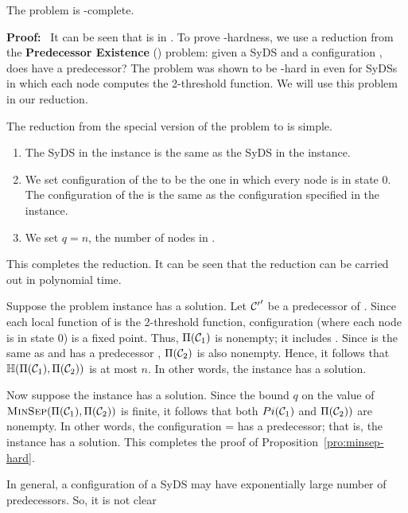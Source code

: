 \begin{proposition}\label{pro:minsep-hard}
The \mps{} problem is \cnp-complete.
\end{proposition}

\noindent
\textbf{Proof:}~ It can be seen that \mps{} is in \cnp.
To prove \cnp-hardness,
we use a reduction from the 
\textbf{Predecessor Existence} (\pre) problem: given a SyDS \cals{} and
a configuration \calc, does \calc{} have a predecessor?
The \pre{} problem was shown to be \cnp-hard in \cite{BH+07}
even for SyDSs in which each node computes the 2-threshold function.
We will use this problem in our reduction.

\smallskip

\noindent
The reduction from the special version of the \pre{} problem to \mps{}
is simple.
\begin{enumerate}
\item The SyDS \cals{} in the \mps{} instance is the same as the SyDS in the
\pre{} instance.
\item We set configuration \calcone{} of the \mps{} to be the one in which
every node is in state 0.
The configuration \calctwo{} of the \mps{} is the same as the configuration
\calc{} specified in the \pre{} instance.
\item We set $q = n$, the number of nodes in \cals.
\end{enumerate}
This completes the reduction. It can be seen that the reduction
can be carried out in polynomial time.

Suppose the \pre{} problem instance has a solution.
Let $\mbox{$\mathcal{C'}$}'$ be a predecessor of \calc.
Since each local function of \cals{} is the 2-threshold function,
configuration \calcone{} (where each node is in state 0) is a fixed point.
Thus, $\Pi(\mbox{$\mathcal{C}_{1}$})$ is nonempty; it includes \calcone.
Since \calctwo{} is the same as \calc{} and \calc{} has a
predecessor \calcp,  $\Pi(\mbox{$\mathcal{C}_{2}$})$ is also nonempty. 
Hence, it follows that $\mbox{$\mathbb{H}$}(\Pi(\mbox{$\mathcal{C}_{1}$}), \Pi(\mbox{$\mathcal{C}_{2}$}))$ is at most $n$.
In other words, the \mps{} instance has a solution.

Now suppose the \mps{} instance has a solution.
Since the bound $q$ on the value of 
$\mbox{\textsc{MinSep}}(\Pi(\mbox{$\mathcal{C}_{1}$}), \Pi(\mbox{$\mathcal{C}_{2}$}))$ is finite, 
it follows that both 
$Pi(\mbox{$\mathcal{C}_{1}$})$ and $\Pi(\mbox{$\mathcal{C}_{2}$}))$ are nonempty. 
In other words, the configuration \calctwo{} = \calc{}
has a predecessor; that is, the \pre{} instance has a solution.
This completes the proof of Proposition~\ref{pro:minsep-hard}. \QED

In general, a configuration of a SyDS may have exponentially large
number of predecessors.
So, it is not clear


